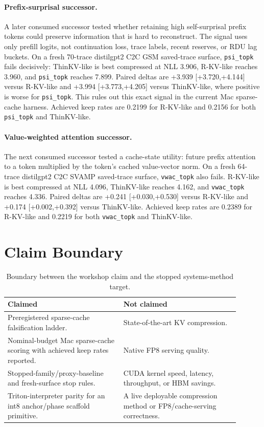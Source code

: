 \documentclass{article}
\begin{document}
\paragraph{Prefix-surprisal successor.}
A later consumed successor tested whether retaining high self-surprisal
prefix tokens could preserve information that is hard to reconstruct. The signal
uses only prefill logits, not continuation loss, trace labels, recent reserves,
or RDU lag buckets. On a fresh 70-trace distilgpt2 C2C GSM saved-trace surface,
\texttt{psi\_topk} fails decisively: ThinKV-like is best compressed at NLL 3.906,
R-KV-like reaches 3.960, and \texttt{psi\_topk} reaches 7.899. Paired deltas are
+3.939 [+3.720,+4.144] versus R-KV-like and +3.994 [+3.773,+4.205] versus
ThinKV-like, where positive is worse for \texttt{psi\_topk}. This rules out this
exact signal in the current Mac sparse-cache harness. Achieved keep rates are
0.2199 for R-KV-like and 0.2156 for both \texttt{psi\_topk} and ThinKV-like.

\paragraph{Value-weighted attention successor.}
The next consumed successor tested a cache-state utility: future prefix attention to a
token multiplied by the token's cached value-vector norm. On a fresh 64-trace
distilgpt2 C2C SVAMP saved-trace surface, \texttt{vwac\_topk} also fails. R-KV-like is best compressed at
NLL 4.096, ThinKV-like reaches 4.162, and \texttt{vwac\_topk} reaches 4.336.
Paired deltas are +0.241 [+0.030,+0.530] versus R-KV-like and +0.174
[+0.002,+0.392] versus ThinKV-like. Achieved keep rates are 0.2389 for
R-KV-like and 0.2219 for both \texttt{vwac\_topk} and ThinKV-like.

\section{Claim Boundary}

\begin{table}[h]
\centering
\small
\begin{tabular}{p{0.45\linewidth}p{0.45\linewidth}}
\toprule
Claimed & Not claimed \\
\midrule
Preregistered sparse-cache falsification ladder. & State-of-the-art KV compression. \\
Nominal-budget Mac sparse-cache scoring with achieved keep rates reported. & Native FP8 serving quality. \\
Stopped-family/proxy-baseline and fresh-surface stop rules. & CUDA kernel speed, latency, throughput, or HBM savings. \\
Triton-interpreter parity for an int8 anchor/phase scaffold primitive. & A live deployable compression method or FP8/cache-serving correctness. \\
\bottomrule
\end{tabular}
\caption{Boundary between the workshop claim and the stopped systems-method target.}
\end{table}
\end{document}

